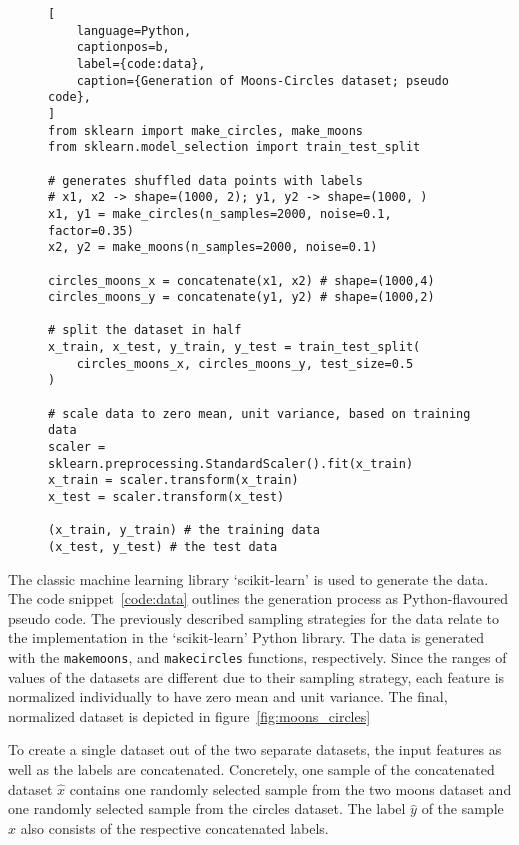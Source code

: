 \begin{figure}[ht]
\centering
\begin{minipage}{\linewidth}
\begin{lstlisting}[
    language=Python,
    captionpos=b, 
    label={code:data},
    caption={Generation of Moons-Circles dataset; pseudo code},
]
from sklearn import make_circles, make_moons
from sklearn.model_selection import train_test_split

# generates shuffled data points with labels
# x1, x2 -> shape=(1000, 2); y1, y2 -> shape=(1000, ) 
x1, y1 = make_circles(n_samples=2000, noise=0.1, factor=0.35)
x2, y2 = make_moons(n_samples=2000, noise=0.1)

circles_moons_x = concatenate(x1, x2) # shape=(1000,4)
circles_moons_y = concatenate(y1, y2) # shape=(1000,2)

# split the dataset in half
x_train, x_test, y_train, y_test = train_test_split(
    circles_moons_x, circles_moons_y, test_size=0.5
)

# scale data to zero mean, unit variance, based on training data
scaler = sklearn.preprocessing.StandardScaler().fit(x_train)
x_train = scaler.transform(x_train)
x_test = scaler.transform(x_test)

(x_train, y_train) # the training data
(x_test, y_test) # the test data
\end{lstlisting}
\end{minipage}
\end{figure}

The classic machine learning library `scikit-learn' is used to generate the data. 
The code snippet~\ref{code:data} outlines the generation process as Python-flavoured pseudo code.
The previously described sampling strategies for the data relate to the implementation in the `scikit-learn' Python library.
The data is generated with the \lstinline{makemoons}, and \lstinline{makecircles} functions, respectively.
Since the ranges of values of the datasets are different due to their sampling strategy, each feature is normalized individually to have zero mean and unit variance.
The final, normalized dataset is depicted in figure~\ref{fig:moons_circles}

To create a single dataset out of the two separate datasets, the input features as well as the labels are concatenated.
Concretely, one sample of the concatenated dataset $\hat x$ contains one randomly selected sample from the two moons dataset and one randomly selected sample from the circles dataset.
The label $\hat y$ of the sample $\hat x$ also consists of the respective concatenated labels.

